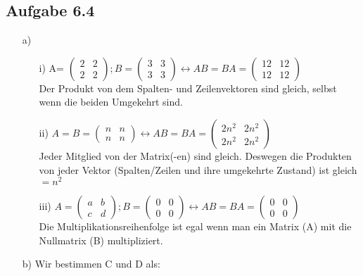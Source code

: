 \documentclass{standalone}
\begin{document}
\subsection{Aufgabe 6.4}
\begin{itemize}
	\item[a)]
	\begin{itemize}
		\item[i)]
		A= $\begin{pmatrix}
			2 & 2 \\
			2 & 2
		\end{pmatrix};
		B=\begin{pmatrix}
			3 & 3 \\
			3 & 3
		\end{pmatrix} \leftrightarrow
		AB=BA=\begin{pmatrix}
			12 & 12 \\
			12 & 12
		\end{pmatrix}$\\
Der Produkt von dem Spalten- und Zeilenvektoren sind gleich, selbst wenn die beiden Umgekehrt sind. 
		\item[ii)]
	$A=
	B=\begin{pmatrix}
		n & n \\
		n & n
	\end{pmatrix} \leftrightarrow
	AB=BA=\begin{pmatrix}
		2n^2 & 2n^2 \\
		2n^2 & 2n^2
	\end{pmatrix}$\\
Jeder Mitglied von der Matrix(-en) sind gleich. Deswegen die Produkten von jeder Vektor (Spalten/Zeilen und ihre umgekehrte Zustand) ist gleich $=n^2$ 
\item[iii)]
$A=\begin{pmatrix}
	a & b \\
	c & d
\end{pmatrix}; 
B=\begin{pmatrix}
	0 & 0 \\
	0 & 0
\end{pmatrix} \leftrightarrow
AB=BA=\begin{pmatrix}
	0 & 0 \\
	0 & 0
\end{pmatrix}$\\
Die Multiplikationsreihenfolge ist egal wenn man ein Matrix (A) mit die Nullmatrix (B) multipliziert.
	\end{itemize}
	\item[b)] Wir bestimmen C und D als:\\
	

\end{itemize}
\end{document}
